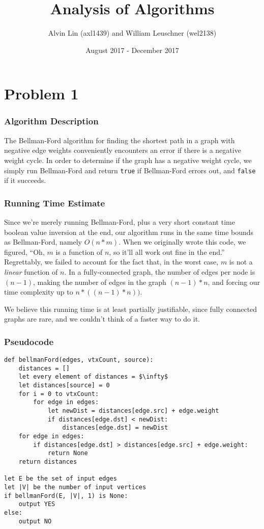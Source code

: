 \documentclass{math}
\title{Analysis of Algorithms}
\author{Alvin Lin (axl1439) and William Leuschner (wel2138)}
\date{August 2017 - December 2017}
\begin{document}
\maketitle


\section*{Problem 1}


\subsubsection*{Algorithm Description}
The Bellman-Ford algorithm for finding the shortest path in a graph with
negative edge weights conveniently encounters an error if there is a negative
weight cycle.  In order to determine if the graph has a negative weight cycle,
we simply run Bellman-Ford and return \texttt{true} if Bellman-Ford errors out,
and \texttt{false} if it succeeds.


\subsubsection*{Running Time Estimate}
Since we're merely running Bellman-Ford, plus a very short constant time boolean
value inversion at the end, our algorithm runs in the same time bounds as
Bellman-Ford, namely \( O(n*m) \).  When we originally wrote this code, we
figured, ``Oh, \( m \) is a function of \( n \), so it'll all work out fine in
the end.''  Regrettably, we failed to account for the fact that, in the worst
case, \( m \) is not a \emph{linear} function of \( n \).  In a fully-connected
graph, the number of edges per node is \( (n - 1) \), making the number of edges
in the graph \( (n - 1) * n \), and forcing our time complexity up to \( n * ((n
- 1) * n)) \).

We believe this running time is at least partially justifiable, since fully
connected graphs are rare, and we couldn't think of a faster way to do it.


\subsubsection*{Pseudocode}

\begin{lstlisting}[mathescape=true]
def bellmanFord(edges, vtxCount, source):
    distances = []
    let every element of distances = $\infty$
    let distances[source] = 0
    for i = 0 to vtxCount:
        for edge in edges:
            let newDist = distances[edge.src] + edge.weight
            if distances[edge.dst] < newDist:
                distances[edge.dst] = newDist
    for edge in edges:
        if distances[edge.dst] > distances[edge.src] + edge.weight:
            return None
    return distances

let E be the set of input edges
let |V| be the number of input vertices
if bellmanFord(E, |V|, 1) is None:
    output YES
else:
    output NO
\end{lstlisting}
\end{document}
